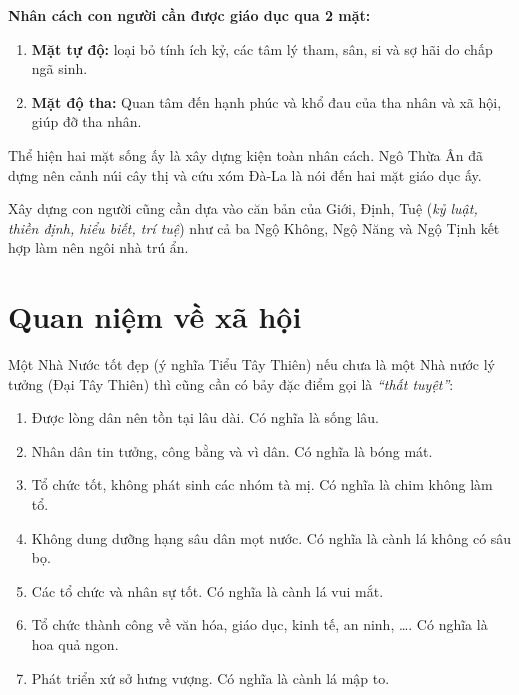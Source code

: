 {\bf Nhân cách con người cần được giáo dục qua 2 mặt:}

\begin{enumerate}[label=\itshape\alph*\upshape/]
   \item {\bf Mặt tự độ:} loại bỏ tính ích kỷ, các tâm lý tham, sân, si và sợ hãi do chấp ngã sinh.

   \item {\bf Mặt độ tha:} Quan tâm đến hạnh phúc và khổ đau của tha nhân và xã hội, giúp đỡ tha nhân.
\end{enumerate}

Thể hiện hai mặt sống ấy là xây dựng kiện toàn nhân cách. Ngô Thừa Ân đã dựng nên cảnh núi cây thị và cứu xóm Đà-La là nói đến hai mặt giáo dục ấy.

Xây dựng con người cũng cần dựa vào căn bản của Giới, Định, Tuệ (\emph{kỷ luật, thiền định, hiểu biết, trí tuệ}) như cả ba Ngộ Không, Ngộ Năng và Ngộ Tịnh kết hợp làm nên ngôi nhà trú ẩn.

\section{Quan niệm về xã hội} %
\label{sec:67_xa_hoi}

Một Nhà Nước tốt đẹp (ý nghĩa Tiểu Tây Thiên) nếu chưa là một Nhà nước lý tưởng (Đại Tây Thiên) thì cũng cần có bảy đặc điểm gọi là \emph{``thất tuyệt''}:

\begin{enumerate}[label=\itshape\arabic*\upshape/]

    \item Được lòng dân nên tồn tại lâu dài. Có nghĩa là sống lâu.

    \item Nhân dân tin tưởng, công bằng và vì dân. Có nghĩa là bóng mát.

    \item Tổ chức tốt, không phát sinh các nhóm tà mị. Có nghĩa là chim không làm tổ.

    \item Không dung dưỡng hạng sâu dân mọt nước. Có nghĩa là cành lá không có sâu bọ.

    \item Các tổ chức và nhân sự tốt. Có nghĩa là cành lá vui mắt.

    \item Tổ chức thành công về văn hóa, giáo dục, kinh tế, an ninh, \ldots. Có nghĩa là hoa quả ngon.

    \item Phát triển xứ sở hưng vượng. Có nghĩa là cành lá mập to.
\end{enumerate}

